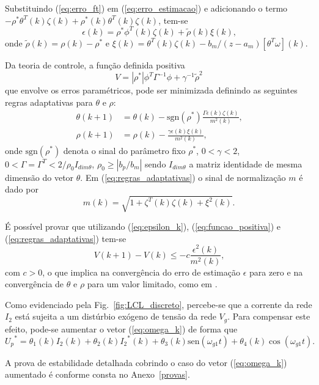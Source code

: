   Substituindo (\ref{eq:erro_ft}) em (\ref{eq:erro_estimacao}) e adicionando o termo $-\rho^* \theta^T (k) \zeta (k) + \rho^* (k) \theta^T (k) \zeta(k)$, tem-se
  \begin{equation}
    \epsilon(k) = \rho^* \phi^T(k) \zeta(k) + \tilde{\rho}(k) \xi(k) \text{,}
    \label{eq:epsilon_k}
  \end{equation}
  onde $\tilde{\rho}(k) = \rho(k) - \rho^*$ e $\xi(k) = \theta^T(k) \zeta(k) - b_m / (z - a_m)[\theta^T \omega](k)$.

  Da teoria de controle, a função definida positiva
  \begin{equation}
    V = |\rho^*| \phi^T \Gamma^{-1} \phi + \gamma^{-1} {\tilde{\rho}}^2
    \label{eq:funcao_positiva}
  \end{equation}
  que envolve os erros paramétricos, pode ser minimizada definindo as seguintes regras adaptativas para $\theta$ e $\rho$:
  \begin{subequations}
    \begin{align}
      \theta(k + 1) & = \theta(k) - \text{sgn}(\rho^*)\frac{\Gamma \epsilon(k)\zeta(k)}{m^2(k)} \text{,}\\
      \rho(k + 1) & = \rho(k) - \frac{\gamma \epsilon(k) \xi(k)}{m^2(k)} \text{,}
    \end{align}
    \label{eq:regras_adaptativas}
  \end{subequations}
  onde $\text{sgn}(\rho^*)$ denota o sinal do parâmetro fixo $\rho^*$, $0 < \gamma < 2$, $0 < \Gamma = \Gamma^T < 2/\rho_0 I_{dim \theta}$, $\rho_0 \geq |b_p / b_m|$ sendo $I_{dim \theta}$ a matriz identidade de mesma dimensão do vetor $\theta$. Em (\ref{eq:regras_adaptativas}) o sinal de normalização $m$ é dado por
  \begin{equation}
    m(k) = \sqrt{1 + \zeta^T(k) \zeta(k) + \xi^2(k)} \text{.}
  \end{equation}

  É possível provar que utilizando (\ref{eq:epsilon_k}), (\ref{eq:funcao_positiva}) e (\ref{eq:regras_adaptativas}) tem-se
  \begin{equation}
    V(k + 1) - V(k) \leq -c \frac{\epsilon^2(k)}{m^2(k)} \text{,}
  \end{equation}
  com $c > 0$, o que implica na convergência do erro de estimação $\epsilon$ para zero e na convergência de $\theta$ e $\rho$ para um valor limitado, como em \cite{ref:TAO}.

  Como evidenciado pela Fig.~\ref{fig:LCL_discreto}, percebe-se que a corrente da rede $I_2$ está sujeita a um distúrbio exógeno de tensão da rede $V_g$. Para compensar este efeito, pode-se aumentar o vetor (\ref{eq:omega_k}) de forma que
  \begin{equation}
    {U_p}^* = \theta_1(k) I_2(k) + \theta_2(k) {I_2}^*(k)+
      \theta_3(k) \text{sen}(\omega_{g1}t) + \theta_4(k) \cos(\omega_{g1} t) \text{.}
  \end{equation}

  A prova de estabilidade detalhada cobrindo o caso do vetor (\ref{eq:omega_k}) aumentado é conforme consta no Anexo~\ref{provas}.



